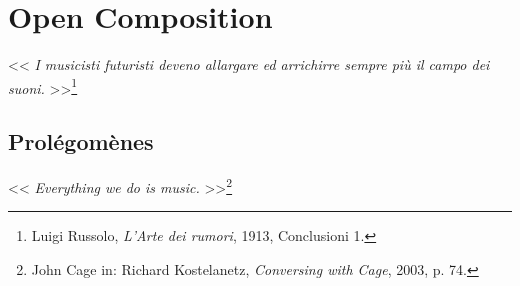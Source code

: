 \chapter*{Open Composition}


 << \textit{I musicisti futuristi deveno allargare ed arrichirre sempre più il campo dei suoni.}  >>\footnote{Luigi Russolo, \textit{L'Arte dei rumori}, 1913, Conclusioni 1.} 

\section*{Prolégomènes}

\thispagestyle{empty}

<< \textit{Everything we do is music.} >>\footnote{John Cage in: Richard Kostelanetz, \textit{Conversing with Cage}, 2003, p. 74.}

\bigskip


\renewcommand{\labelenumii}{\arabic{enumi}.\arabic{enumii}.}

